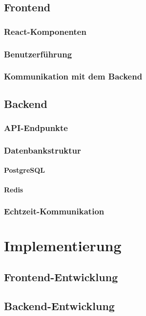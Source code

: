 \documentclass[a4paper,12pt]{report}
\begin{document}
    \section{Frontend}
        \subsection{React-Komponenten}
    
        \subsection{Benutzerführung}
        \subsection{Kommunikation mit dem Backend}
    \section{Backend}
        \subsection{API-Endpunkte}
        \subsection{Datenbankstruktur}
        		\subsubsection{PostgreSQL}
        		\subsubsection{Redis}
        \subsection{Echtzeit-Kommunikation}

\chapter{Implementierung}
    \section{Frontend-Entwicklung}
    \section{Backend-Entwicklung}
\end{document}
